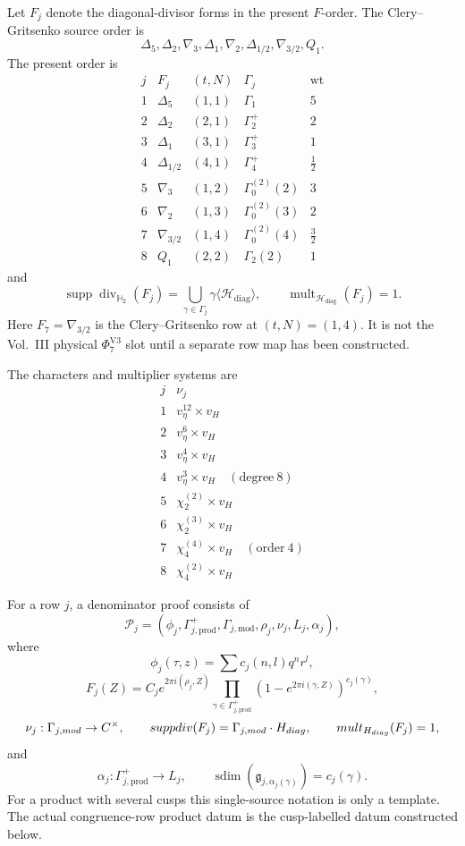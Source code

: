 \documentclass[11pt]{memoir}
\newcommand{\sdim}{\operatorname{sdim}}
\begin{document}
Let $F_j$ denote the diagonal-divisor forms in the present \(F\)-order.
The Clery--Gritsenko source order is
$$
\Delta_5,\Delta_2,\nabla_3,\Delta_1,\nabla_2,\Delta_{1/2},
\nabla_{3/2},Q_1.
$$
The present order is \cite{GC}
$$
\begin{array}{c|c|c|c|c}
j&F_j&(t,N)&\Gamma_j&\mathrm{wt}\\ \hline
1&\Delta_5&(1,1)&\Gamma_1&5\\
2&\Delta_2&(2,1)&\Gamma_2^+&2\\
3&\Delta_1&(3,1)&\Gamma_3^+&1\\
4&\Delta_{1/2}&(4,1)&\Gamma_4^+&\frac12\\
5&\nabla_3&(1,2)&\Gamma_0^{(2)}(2)&3\\
6&\nabla_2&(1,3)&\Gamma_0^{(2)}(3)&2\\
7&\nabla_{3/2}&(1,4)&\Gamma_0^{(2)}(4)&\frac32\\
8&Q_1&(2,2)&\Gamma_2(2)&1
\end{array}
$$
and
$$
\operatorname{supp}\operatorname{div}_{\mathbb H_2}(F_j)=
\bigcup_{\gamma\in\Gamma_j}\gamma\langle\mathcal H_{\mathrm{diag}}\rangle,
\qquad
\operatorname{mult}_{\mathcal H_{\mathrm{diag}}}(F_j)=1.
$$
Here $F_7=\nabla_{3/2}$ is the Clery--Gritsenko row at
$(t,N)=(1,4)$.  It is not the Vol.~III physical
$\Phi^{\mathrm{V3}}_7$ slot until a separate row map has been
constructed.

The characters and multiplier systems are
$$
\begin{array}{c|c}
j&\nu_j\\ \hline
1&v_\eta^{12}\times v_H\\
2&v_\eta^{6}\times v_H\\
3&v_\eta^{4}\times v_H\\
4&v_\eta^{3}\times v_H\quad(\mathrm{degree}\ 8)\\
5&\chi_2^{(2)}\times v_H\\
6&\chi_2^{(3)}\times v_H\\
7&\chi_4^{(4)}\times v_H\quad(\mathrm{order}\ 4)\\
8&\chi_4^{(2)}\times v_H
\end{array}
$$

\begin{definition}
For a row $j$, a denominator proof consists of
$$
\mathscr P_j=(\phi_j,\Gamma_{j,\mathrm{prod}}^+,
\Gamma_{j,\mathrm{mod}},\rho_j,\nu_j,L_j,\alpha_j),
$$
where
$$\phi_j(\tau,z)=\sum c_j(n,l)q^nr^l,$$
$$F_j(Z)=C_j e^{2\pi i(\rho_j,Z)}
\prod_{\gamma\in\Gamma_{j,\mathrm{prod}}^+}
(1-e^{2\pi i(\gamma,Z)})^{c_j(\gamma)},$$
$$\nu_j:\Gamma_{j,mod}\rightarrow C^\times,\qquad
suppdiv(F_j)=
\Gamma_{j,mod}\cdot H_{diag},
\qquad mult_{H_{diag}}(F_j)=1,$$
and
$$\alpha_j:\Gamma_{j,\mathrm{prod}}^+\rightarrow L_j,\qquad
\sdim(\mathfrak g_{j,\alpha_j(\gamma)})=c_j(\gamma).$$
For a product with several cusps this single-source notation is only a
template.  The actual congruence-row product datum is the
cusp-labelled datum constructed below.
\end{definition}
\end{document}

